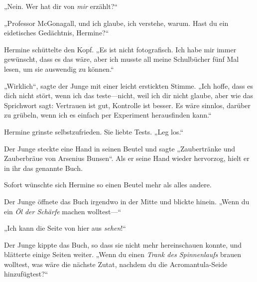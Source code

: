 „Nein. Wer hat dir von \emph{mir} erzählt?“

„Professor McGonagall, und ich glaube, ich verstehe, warum. Hast du ein eidetisches Gedächtnis, Hermine?“

Hermine schüttelte den Kopf. „Es ist nicht fotografisch. Ich habe mir immer gewünscht, dass es das wäre, aber ich musste all meine Schulbücher fünf Mal lesen, um sie auswendig zu können.“

„Wirklich“, sagte der Junge mit einer leicht erstickten Stimme. „Ich hoffe, dass es dich nicht stört, wenn ich das teste—nicht, weil ich dir nicht glaube, aber wie das Sprichwort sagt: Vertrauen ist gut, Kontrolle ist besser. Es wäre sinnlos, darüber zu grübeln, wenn ich es einfach per Experiment herausfinden kann.“

Hermine grinste selbstzufrieden. Sie liebte Tests. „Leg los.“

Der Junge steckte eine Hand in seinen Beutel und sagte „Zaubertränke und Zauberbräue von Arsenius Bunsen“. Als er seine Hand wieder hervorzog, hielt er in ihr das genannte Buch.

Sofort wünschte sich Hermine so einen Beutel mehr als alles andere.

Der Junge öffnete das Buch irgendwo in der Mitte und blickte hinein. „Wenn du ein \emph{Öl der Schärfe} machen wolltest—“

„Ich kann die Seite von hier aus \emph{sehen}!“

Der Junge kippte das Buch, so dass sie nicht mehr hereinschauen konnte, und blätterte einige Seiten weiter. „Wenn du einen \emph{Trank des Spinnenlaufs} brauen wolltest, was wäre die nächste Zutat, nachdem du die Acromantula-Seide hinzufügtest?“

